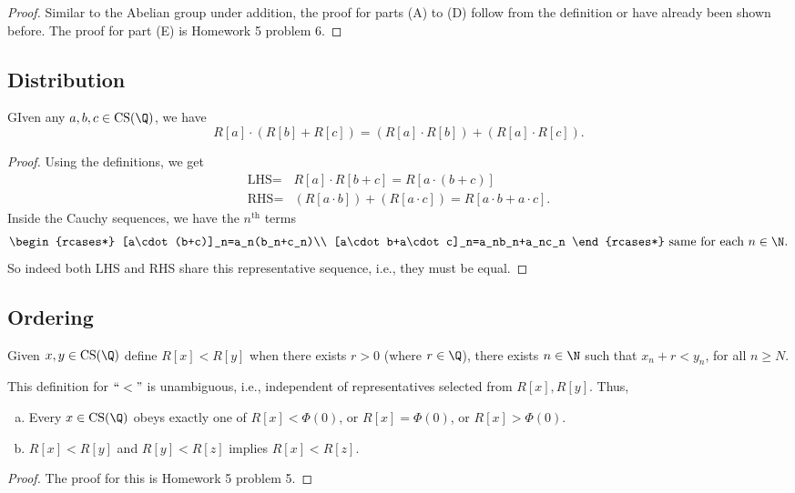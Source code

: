 \begin{proof}
	Similar to the Abelian group under addition, the proof for parts (A) to (D) follow from the definition or have already been shown before. The proof for part (E) is Homework 5 problem 6.
\end{proof}

\subsection{Distribution}
\begin{nproposition}{}
	GIven any \(a,b,c\in\operatorname{CS}(\Q)\), we have 
	\begin{equation*}
		R[a]\cdot(R[b]+R[c])=(R[a]\cdot R[b])+(R[a]\cdot R[c]).
	\end{equation*}
\end{nproposition}
\begin{proof}
	Using the definitions, we get 
	\begin{align*}
		\text{LHS}=&R[a]\cdot R[b+c]=R[a\cdot (b+c)]\\
		\text{RHS}=&(R[a\cdot b])+(R[a\cdot c])=R[a\cdot b+a\cdot c].
	\end{align*}
	Inside the Cauchy sequences, we have the \(n^{\text{th}}\) terms 
	\begin{equation*}
		\begin{rcases*}
			[a\cdot (b+c)]_n=a_n(b_n+c_n)\\
			[a\cdot b+a\cdot c]_n=a_nb_n+a_nc_n
		\end{rcases*}~\text{same for each \(n\in\N\)}.
	\end{equation*}
	So indeed both LHS and RHS share this representative sequence, i.e., they must be equal.
\end{proof}

\subsection{Ordering}
\begin{ndef}{}
	Given \(x,y\in\operatorname{CS}(\Q)\) define \(R[x]<R[y]\) when there exists \(r>0\) (where \(r\in\Q\)), there exists \(n\in\N\) such that \(x_n+r<y_n\), for all \(n\geq N\).
\end{ndef}
\begin{nproposition}{}
	This definition for \(``<"\) is unambiguous, i.e., independent of representatives selected from \(R[x], R[y]\). Thus, 
	\begin{enumerate}[(a)]
		\item Every \(x\in\operatorname{CS}(\Q)\) obeys exactly one of \(R[x]<\Phi(0)\), or \(R[x]=\Phi(0)\), or \(R[x]>\Phi(0)\).
		
		\item \(R[x]<R[y]\) and \(R[y]<R[z]\) implies \(R[x]<R[z]\).
	\end{enumerate}
\end{nproposition}
\begin{proof}
	The proof for this is Homework 5 problem 5.
\end{proof}